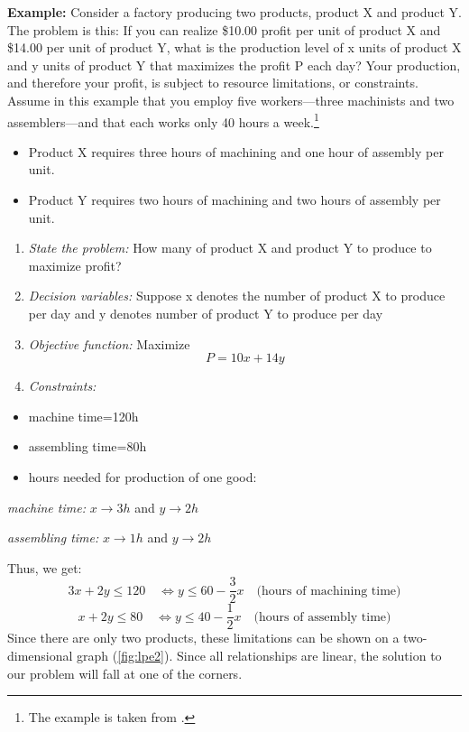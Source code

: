\documentclass[
  12pt,
  oneside]{book}
\providecommand{\tightlist}{%
  \setlength{\itemsep}{0pt}\setlength{\parskip}{0pt}}
\theoremstyle{definition}
\theoremstyle{definition}
\theoremstyle{definition}
\theoremstyle{definition}
\theoremstyle{remark}
\begin{document}
\textbf{Example:}
Consider a factory producing two products, product X and product Y. The problem is this: If
you can realize \$10.00 profit per unit of product X and \$14.00 per unit of product Y, what is the production level of x units of product X and y units of product Y that maximizes the profit P each day? Your production, and therefore your profit, is subject to resource limitations, or constraints. Assume in this example that you employ five workers---three machinists and two assemblers---and that each works only 40 hours a week.\footnote{The example is taken from \citet[p.~134f]{Morse2014Managing}.}

\begin{itemize}
\tightlist
\item
  Product X requires three hours of machining and one hour of assembly per unit.
\item
  Product Y requires two hours of machining and two hours of assembly per unit.
\end{itemize}

\begin{enumerate}
\def\labelenumi{\arabic{enumi}.}
\tightlist
\item
  \emph{State the problem:} How many of product X and product Y to produce to maximize profit?
\item
  \emph{Decision variables:} Suppose x denotes the number of product X to produce per day and y denotes number of product Y to produce per day
\item
  \emph{Objective function:} Maximize \[P = 10x + 14y\]
\item
  \emph{Constraints:}
\end{enumerate}

\begin{itemize}
\tightlist
\item
  machine time=120h
\item
  assembling time=80h
\item
  hours needed for production of one good:
\end{itemize}

\emph{machine time:} \(x\rightarrow 3h\) and \(y \rightarrow 2h\)

\emph{assembling time:} \(x\rightarrow 1h\) and \(y \rightarrow 2h\)

Thus, we get:
\[3x + 2y \leq 120 \quad \Leftrightarrow y\leq 60-\frac{3}{2}x \quad \text{(hours of machining time)}\]
\[x + 2y \leq 80 \quad \Leftrightarrow y \leq 40-\frac{1}{2}x \quad \text{(hours of assembly time)}\]
Since there are only two products, these limitations can be shown on a two-dimensional graph (\ref{fig:lpe2}). Since all relationships are linear, the solution to our problem will fall at one of the corners.
\end{document}
